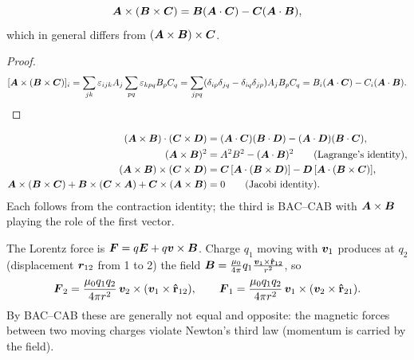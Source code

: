 \begin{theorem}
\[
    \vect{A}\times(\vect{B}\times\vect{C}) = \vect{B}(\vect{A}\cdot\vect{C}) - \vect{C}(\vect{A}\cdot\vect{B}),
\]
which in general differs from $(\vect{A}\times\vect{B})\times\vect{C}$.
\end{theorem}
\begin{proof}
\[
    [\vect{A}\times(\vect{B}\times\vect{C})]_i = \sum_{jk}\varepsilon_{ijk}A_j\sum_{pq}\varepsilon_{kpq}B_pC_q
    = \sum_{jpq}(\delta_{ip}\delta_{jq}-\delta_{iq}\delta_{jp})A_jB_pC_q
    = B_i(\vect{A}\cdot\vect{C}) - C_i(\vect{A}\cdot\vect{B}).\qedhere
\]
\end{proof}

\begin{fact}
\begin{align*}
    (\vect{A}\times\vect{B})\cdot(\vect{C}\times\vect{D}) &= (\vect{A}\cdot\vect{C})(\vect{B}\cdot\vect{D}) - (\vect{A}\cdot\vect{D})(\vect{B}\cdot\vect{C}),\\
    (\vect{A}\times\vect{B})^2 &= A^2B^2 - (\vect{A}\cdot\vect{B})^2 \qquad\text{(Lagrange's identity)},\\
    (\vect{A}\times\vect{B})\times(\vect{C}\times\vect{D}) &= \vect{C}\,[\vect{A}\cdot(\vect{B}\times\vect{D})] - \vect{D}\,[\vect{A}\cdot(\vect{B}\times\vect{C})],\\
    \vect{A}\times(\vect{B}\times\vect{C}) + \vect{B}\times(\vect{C}\times\vect{A}) + \vect{C}\times(\vect{A}\times\vect{B}) &= 0 \qquad\text{(Jacobi identity)}.
\end{align*}
Each follows from the contraction identity; the third is BAC--CAB with $\vect{A}\times\vect{B}$ playing the role of the first vector.
\end{fact}

\begin{example}
The Lorentz force is $\vect{F} = q\vect{E} + q\lvect{v}\times\vect{B}$. Charge $q_1$ moving with $\bm{v}_1$ produces at $q_2$ (displacement $\bm{r}_{12}$ from 1 to 2) the field $\vect{B} = \frac{\mu_0}{4\pi}q_1\frac{\lvect{v}_1\times\uvect{r}_{12}}{r^2}$, so
\[
    \vect{F}_2 = \frac{\mu_0q_1q_2}{4\pi r^2}\,\lvect{v}_2\times(\lvect{v}_1\times\uvect{r}_{12}),
    \qquad
    \vect{F}_1 = \frac{\mu_0q_1q_2}{4\pi r^2}\,\lvect{v}_1\times(\lvect{v}_2\times\uvect{r}_{21}).
\]
By BAC--CAB these are generally not equal and opposite: the magnetic forces between two moving charges violate Newton's third law (momentum is carried by the field).
\end{example}

